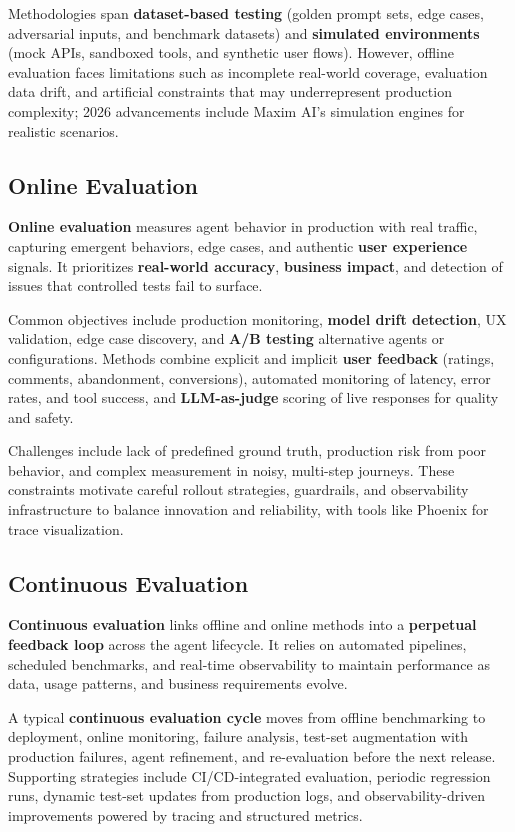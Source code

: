 \begin{TNtwocol}
Methodologies span \textbf{dataset-based testing} (golden prompt sets, edge cases, adversarial inputs, and benchmark datasets) and \textbf{simulated environments} (mock APIs, sandboxed tools, and synthetic user flows). However, offline evaluation faces limitations such as incomplete real-world coverage, evaluation data drift, and artificial constraints that may underrepresent production complexity; 2026 advancements include Maxim AI's simulation engines for realistic scenarios.
​

\subsection*{Online Evaluation}

\textbf{Online evaluation} measures agent behavior in production with real traffic, capturing emergent behaviors, edge cases, and authentic \textbf{user experience} signals. It prioritizes \textbf{real-world accuracy}, \textbf{business impact}, and detection of issues that controlled tests fail to surface.

Common objectives include production monitoring, \textbf{model drift detection}, UX validation, edge case discovery, and \textbf{A/B testing} alternative agents or configurations. Methods combine explicit and implicit \textbf{user feedback} (ratings, comments, abandonment, conversions), automated monitoring of latency, error rates, and tool success, and \textbf{LLM-as-judge} scoring of live responses for quality and safety.

Challenges include lack of predefined ground truth, production risk from poor behavior, and complex measurement in noisy, multi-step journeys. These constraints motivate careful rollout strategies, guardrails, and observability infrastructure to balance innovation and reliability, with tools like Phoenix for trace visualization.
​

\subsection*{Continuous Evaluation}

\textbf{Continuous evaluation} links offline and online methods into a \textbf{perpetual feedback loop} across the agent lifecycle. It relies on automated pipelines, scheduled benchmarks, and real-time observability to maintain performance as data, usage patterns, and business requirements evolve.

A typical \textbf{continuous evaluation cycle} moves from offline benchmarking to deployment, online monitoring, failure analysis, test-set augmentation with production failures, agent refinement, and re-evaluation before the next release. Supporting strategies include CI/CD-integrated evaluation, periodic regression runs, dynamic test-set updates from production logs, and observability-driven improvements powered by tracing and structured metrics.


\end{TNtwocol}
